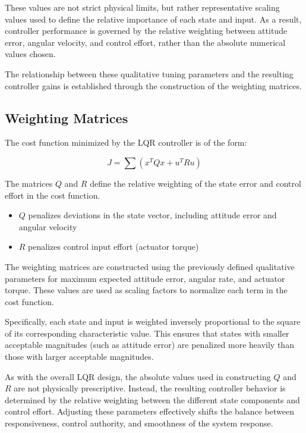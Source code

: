 These values are not strict physical limits, but rather representative scaling values used to define the relative importance of each state and input. As a result, controller performance is governed by the relative weighting between attitude error, angular velocity, and control effort, rather than the absolute numerical values chosen.

The relationship between these qualitative tuning parameters and the resulting controller gains is established through the construction of the weighting matrices.

\subsection{Weighting Matrices}

The cost function minimized by the LQR controller is of the form:

\[
J = \sum (x^T Q x + u^T R u)
\]

The matrices $Q$ and $R$ define the relative weighting of the state error and control effort in the cost function.

\begin{itemize}
	\item $Q$ penalizes deviations in the state vector, including attitude error and angular velocity
	\item $R$ penalizes control input effort (actuator torque)
\end{itemize}

The weighting matrices are constructed using the previously defined qualitative parameters for maximum expected attitude error, angular rate, and actuator torque. These values are used as scaling factors to normalize each term in the cost function.

Specifically, each state and input is weighted inversely proportional to the square of its corresponding characteristic value. This ensures that states with smaller acceptable magnitudes (such as attitude error) are penalized more heavily than those with larger acceptable magnitudes.

As with the overall LQR design, the absolute values used in constructing $Q$ and $R$ are not physically prescriptive. Instead, the resulting controller behavior is determined by the relative weighting between the different state components and control effort. Adjusting these parameters effectively shifts the balance between responsiveness, control authority, and smoothness of the system response.

